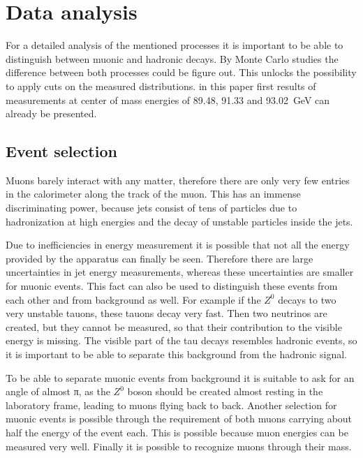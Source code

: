 \documentclass[epj,nopacs]{svjour}
\begin{document}
\section{ Data analysis}

For a detailed analysis of the mentioned processes it is important to be able
to distinguish between muonic and hadronic decays. By Monte Carlo studies the
difference between both processes could be figure out. This unlocks the
possibility to apply cuts on the measured distributions. in this paper first
results of measurements at center of mass energies of 89.48, 91.33 and
\SI{93.02}{\giga\electronvolt} can already be presented.

\subsection{ Event selection}
Muons barely interact with any matter, therefore there are only very few
entries in the calorimeter along the track of the muon. This has an immense
discriminating power, because jets consist of tens of particles due to
hadronization at high energies and the decay of unstable particles inside the
jets.

Due to inefficiencies in energy measurement it is possible that not all the
energy provided by the apparatus can finally be seen. Therefore there are large
uncertainties in jet energy measurements, whereas these uncertainties are
smaller for muonic events. This fact can also be used to distinguish these
events from each other and from background as well. For example if the $Z^0$
decays to two very unstable tauons, these tauons decay very fast. Then two
neutrinos are created, but they cannot be measured, so that their contribution
to the visible energy is missing. The visible part of the tau decays resembles
hadronic events, so it is important to be able to separate this background from
the hadronic signal.

To be able to separate muonic events from background it is suitable to ask for
an angle of almost π, as the $Z^0$ boson should be created almost resting in
the laboratory frame, leading to muons flying back to back. Another selection
for muonic events is possible through the requirement of both muons carrying
about half the energy of the event each. This is possible because muon energies
can be measured very well. Finally it is possible to recognize muons through
their mass.
\end{document}
